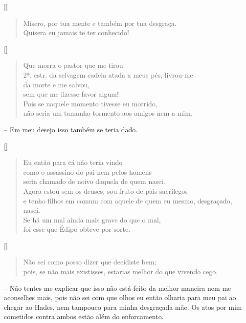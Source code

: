 \hfill [] 

\begin{verse}Mísero, por tua mente e também por tua desgraça.\\
Quisera eu jamais te ter conhecido!
\end{verse}

\hfill [] 

\begin{verse}Que morra o pastor que me tirou\\ 2ª. estr.
da selvagem cadeia atada a meus pés, livrou-me\\ 
da morte e me salvou,\\
sem que me fizesse favor algum!\\
Pois se naquele momento tivesse eu morrido,\\
não seria um tamanho tormento aos amigos nem a mim.
\end{verse}

 --   Em meu desejo isso também se teria dado.

\hfill [] 

\begin{verse}Eu então para cá não teria vindo\\
como o assassino do pai nem pelos homens\\
seria chamado de noivo daquela de quem nasci.\\
Agora estou sem os deuses, sou fruto de pais sacrílegos\\ 
e tenho filhos em comum com aquele de quem eu mesmo, desgraçado, nasci.\\
Se há um mal ainda mais grave do que o mal,\\
foi esse que Édipo obteve por sorte.
\end{verse}


\hfill [] 

\begin{verse}Não sei como posso dizer que decidiste bem;\\
pois, se não mais existisses, estarias melhor do que vivendo cego.
\end{verse}

 --    Não tentes me explicar que isso não está feito da melhor maneira
nem me aconselhes mais, pois não sei com que olhos eu então olharia para
meu pai ao chegar ao Hades, nem tampouco para minha desgraçada mãe. Os
atos por mim cometidos contra ambos estão além do enforcamento.

